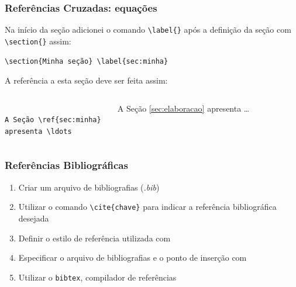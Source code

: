 \begin{frame}[fragile]
\frametitle{Referências Cruzadas: equações}

Na início da seção adicionei o comando \verb|\label{}| após a definição da seção com
\verb|\section{}| assim:
\begin{verbatim}
\section{Minha seção} \label{sec:minha}
\end{verbatim}

A referência a esta seção deve ser feita assim:

\begin{columns}
\begin{verbatim}

A Seção \ref{sec:minha} 
apresenta \ldots

\end{verbatim}

\begin{framed}
A Seção \ref{sec:elaboracao}
apresenta \ldots
\end{framed}
\end{columns}
\end{frame}


\begin{frame}[fragile]
\frametitle{Referências Bibliográficas}

\begin{enumerate}
  \item Criar um arquivo de bibliografias (\textit{.bib})
  \item Utilizar o comando \verb|\cite{chave}| para indicar a referência bibliográfica desejada
  \item Definir o estilo de referência utilizada com \verb||
  \item Especificar o arquivo de bibliografias e o ponto de inserção com
  \verb||
  \item Utilizar o \texttt{bibtex}, compilador de referências
\end{enumerate}
 
\end{frame}

